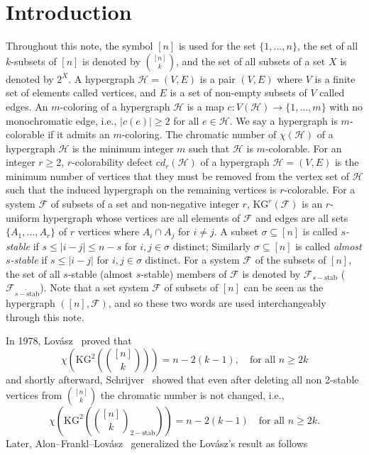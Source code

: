 \documentclass[preprint,12pt,3p]{elsarticle}
\begin{document}
\section{Introduction}
Throughout this note, the symbol $[n]$ is used for the set $\{1,\ldots, n\}$, the set of all $k$-subsets of $[n]$ is denoted by $\binom{[n]}{k}$, and the set of all subsets of a set $X$ is denoted by $2^X$. A hypergraph $\mathcal{H}=\left(V, E\right)$ is a pair $\left(V, E\right)$ where $V$ is a finite set of elements called vertices, and $E$ is a set of non-empty subsets of $V$ called edges. An $m$-coloring of a hypergraph $\mathcal{H}$ is a map $c: V\left(\mathcal{H}\right)\to\{1,\ldots, m\}$ with no monochromatic edge, i.e., $|c\left(e\right)|\geq 2$ for all $e\in\mathcal{H}$. We say a hypergraph is $m$-colorable if it admits an $m$-coloring. The chromatic number of $\chi\left(\mathcal{H}\right)$ of a hypergraph $\mathcal{H}$ is the minimum integer $m$ such that $\mathcal{H}$ is $m$-colorable. For an integer $r\geq 2$, $r$-colorability defect $cd_{r}\left(\mathcal{H}\right)$ of a hypergraph $\mathcal{H}=\left(V, E\right)$ is the minimum number of vertices that they must be removed from the vertex set of $\mathcal{H}$ such that the induced hypergraph on the remaining vertices is $r$-colorable. For a system $\mathcal{F}$ of subsets of a set and non-negative integer $r$, $\textrm{KG}^{r}\left(\mathcal{F}\right)$ is an $r$-uniform hypergraph whose vertices are all elements of $\mathcal{F}$ and edges are all sets $\{A_1, \ldots , A_r\}$ of $r$ vertices where $A_i\cap A_j$ for $i\neq j$. A subset $\sigma \subseteq [n]$ is called \textit{$s$-stable} if $s\leq |i-j|\leq n-s$ for $i, j\in \sigma$ distinct; Similarly $\sigma\subseteq [n]$ is called \textit{almost $s$-stable} if $s\leq |i-j|$ for $i, j\in \sigma$ distinct. For a system $\mathcal{F}$ of the subsets of $[n]$, the set of all $s$-stable (almost $s$-stable) members of $\mathcal{F}$ is denoted by $\mathcal{F}_{s-\text{stab}}$ ($\mathcal{F}_{\widetilde{s-\text{stab}}}$). Note that a set system $\mathcal{F}$ of subsets of $[n]$ can be seen as the hypergraph $\left([n], \mathcal{F}\right)$, and so these two words are used interchangeably through this note. 


In 1978, Lov\'{a}sz~\cite{Lo78} proved that
$$\chi\left(\textrm{KG}^2\left(\binom{[n]}{k}\right)\right)=n-2\left(k-1\right),\quad \text{for all}\,\, n\geq 2k$$ 
and shortly afterward, Schrijver~\cite{Sch78} showed that even after deleting all non 2-stable vertices from $\binom{[n]}{k}$ the chromatic number is not changed, i.e., 
$$\chi\left(\textrm{KG}^2\left({{\binom{[n]}{k}}_{2-\text{stab}}}\right)\right)=n-2\left(k-1\right)\quad \text{for all}\,\, n\geq 2k.$$
Later, Alon--Frankl--Lov\'{a}sz~\cite{alon1986chromatic} generalized the Lov\'{a}sz's result as follows
\end{document}
